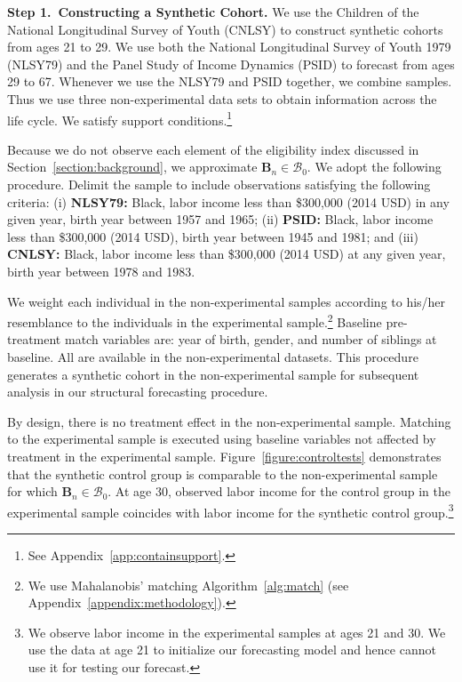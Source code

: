 \noindent \textbf{Step 1.\ Constructing a Synthetic Cohort.} We use the Children of the National Longitudinal Survey of Youth (CNLSY) to construct synthetic cohorts from ages 21 to 29. We use both the National Longitudinal Survey of Youth 1979 (NLSY79) and the Panel Study of Income Dynamics (PSID) to forecast from ages 29 to 67. Whenever we use the NLSY79 and PSID together, we combine samples. Thus we use three non-experimental data sets to obtain information across the life cycle. We satisfy support conditions.\footnote{See Appendix~\ref{app:containsupport}.}

Because we do not observe each element of the eligibility index discussed in Section~\ref{section:background}, we approximate $\bm{B}_{n} \in \mathcal{B}_0$. We adopt the following procedure. Delimit the sample to include observations satisfying the following criteria: (i) \textbf{NLSY79:} Black, labor income less than \$300,000 (2014 USD) in any given year, birth year between 1957 and 1965; (ii) \textbf{PSID:} Black, labor income less than \$300,000 (2014 USD), birth year between 1945 and 1981; and (iii) \textbf{CNLSY:} Black, labor income less than \$300,000 (2014 USD) at any given year, birth year between 1978 and 1983.

We weight each individual in the non-experimental samples according to his/her resemblance to the individuals in the experimental sample.\footnote{We use Mahalanobis' matching Algorithm~\ref{alg:match} (see Appendix~\ref{appendix:methodology}).} Baseline pre-treatment match variables are: year of birth, gender, and number of siblings at baseline. All are available in the non-experimental datasets. This procedure generates a synthetic cohort in the non-experimental sample for subsequent analysis in our structural forecasting procedure.

By design, there is no treatment effect in the non-experimental sample. Matching to the experimental sample is executed using baseline variables not affected by treatment in the experimental sample. Figure~\ref{figure:controltests} demonstrates that the synthetic control group is comparable to the non-experimental sample for which $\bm{B}_{n} \in \mathcal{B}_0$. At age 30, observed labor income for the control group in the experimental sample coincides with labor income for the synthetic control group.\footnote{We observe labor income in the experimental samples at ages 21 and 30. We use the data at age 21 to initialize our forecasting model and hence cannot use it for testing our forecast.}

